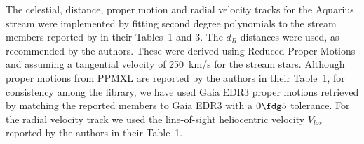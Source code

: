 The celestial, distance, proper motion and radial velocity tracks for the Aquarius stream were implemented by fitting second degree polynomials to the stream members reported by \citet{Williams2011} in their Tables~1 and 3. The $d_R$ distances were used, as recommended by the authors. These were derived using Reduced Proper Motions and assuming a tangential velocity of 250~km/s for the stream stars. Although proper motions from PPMXL are reported by the authors in their Table~1, for consistency among the library, we have used Gaia EDR3 proper motions retrieved by matching the reported members to Gaia EDR3 with a $0\fdg5$ tolerance. For the radial velocity track we used the line-of-sight heliocentric velocity $V_{los}$ reported by the authors in their Table~1.
